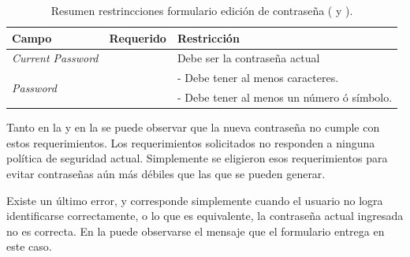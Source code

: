		\begin{table}[h!]
		    \centering
			\begin{tabular}{ |l|c||l| }
				\hline Campo & Requerido & Restricción \\ \hline
				\multirow{1}{*}{\textit{Current Password}} 	&  \checkmark 					&  Debe ser la contraseña actual\\ \hline
				\multirow{2}{*}{\textit{Password}} 			&  \multirow{2}{*}{\checkmark}	&  - Debe tener al menos  caracteres.\\
															&  								&  - Debe tener al menos un número ó símbolo.\\ \hline
			\end{tabular}
		 	\caption{Resumen restrincciones formulario edición de contraseña (  y ).}
		    \label{tab:profile:form:restrictions:update_password}
		\end{table}


		Tanto en la  y en la  se puede observar que la nueva contraseña no cumple con estos requerimientos.
		Los requerimientos solicitados no responden a ninguna política de seguridad actual. Simplemente se eligieron esos requerimientos para evitar contraseñas aún más débiles que las que se pueden generar.


		Existe un último error, y corresponde simplemente cuando el usuario no logra identificarse correctamente, o lo que es equivalente, la contraseña actual ingresada no es correcta. En la  puede observarse el mensaje que el formulario entrega en este caso.








